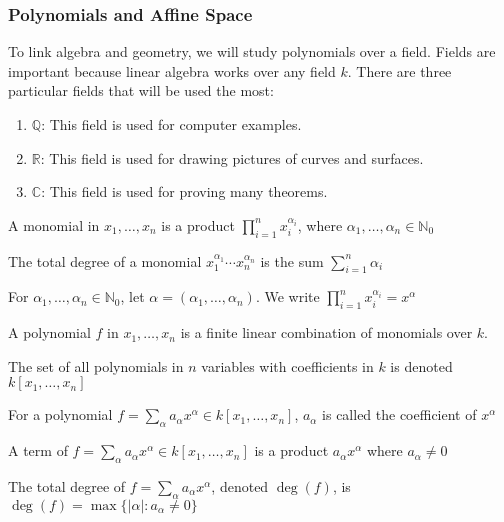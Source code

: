 \documentclass[crop=false,class=book,oneside]{standalone}
\begin{document}
\subsubsection{Polynomials and Affine Space}
To link algebra and geometry, we will study polynomials over a field. Fields are important because linear algebra works over any field $k$. There are three particular fields that will be used the most:
\begin{enumerate}
    \item $\mathbb{Q}$: This field is used for computer examples.
    \item $\mathbb{R}$: This field is used for drawing pictures of curves and surfaces.
    \item $\mathbb{C}$: This field is used for proving many theorems.
\end{enumerate}
\begin{definition}
A monomial in $x_1,\hdots,x_n$ is a product $\prod_{i=1}^{n}x_{i}^{\alpha_{i}}$, where $\alpha_{1},\hdots,\alpha_{n}\in\mathbb{N}_0$
\end{definition}
\begin{definition}
The total degree of a monomial $x_1^{\alpha_1}\cdots x_n^{\alpha_n}$ is the sum $\sum_{i=1}^{n}\alpha_{i}$
\end{definition}
\begin{notation}
For $\alpha_1,\hdots, \alpha_n\in \mathbb{N}_0$, let $\alpha = (\alpha_1,\hdots ,\alpha_n)$. We write $\prod_{i=1}^{n}x_{i}^{\alpha_{i}}=x^{\alpha}$
\end{notation}
\begin{definition}
A polynomial $f$ in $x_1,\hdots, x_n$ is a finite linear combination of monomials over $k$.
\end{definition}
\begin{notation}
The set of all polynomials in $n$ variables with coefficients in $k$ is denoted $k[x_1,\hdots ,x_n]$
\end{notation}
\begin{definition}
For a polynomial $f = \sum_{\alpha} a_\alpha x^\alpha \in k[x_1,\hdots ,x_n]$, $a_\alpha$ is called the coefficient of $x^\alpha$
\end{definition}
\begin{definition}
A term of $f=\sum_{\alpha} a_\alpha x^\alpha \in k[x_1,\hdots ,x_n]$ is a product $a_\alpha x^\alpha$ where $a_\alpha \ne 0$
\end{definition}
\begin{definition}
The total degree of $f=\sum_{\alpha}a_\alpha x^\alpha$, denoted $\deg(f)$, is $\deg(f) = \max\{|\alpha|:a_\alpha \ne 0\}$
\end{definition}
\end{document}
